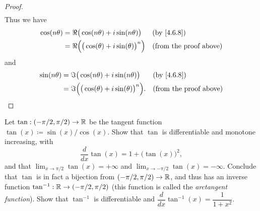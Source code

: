 \begin{proof}
\begin{align*}
  \end{align*}
  Thus we have
  \begin{align*}
    \cos(n \theta) & = \Re\big(\cos(n \theta) + i \sin(n \theta)\big)         &  & \text{(by \cref{4.6.8})}      \\
                   & = \Re\Big(\big(\cos(\theta) + i \sin(\theta)\big)^n\Big) &  & \text{(from the proof above)}
  \end{align*}
  and
  \begin{align*}
    \sin(n \theta) & = \Im\big(\cos(n \theta) + i \sin(n \theta)\big)          &  & \text{(by \cref{4.6.8})}      \\
                   & = \Im\Big(\big(\cos(\theta) + i \sin(\theta)\big)^n\Big). &  & \text{(from the proof above)}
  \end{align*}
\end{proof}

\begin{ex}\label{ex:4.7.8}
  Let \(\tan : (- \pi / 2, \pi / 2) \to \mathbb{R}\) be the tangent function \(\tan(x) \coloneqq \sin(x) / \cos(x)\).
  Show that \(\tan\) is differentiable and monotone increasing, with
  \[
    \dfrac{d}{dx} \tan(x) = 1 + \big(\tan(x)\big)^2,
  \]
  and that \(\lim_{x \to \pi / 2} \tan(x) = +\infty\) and \(\lim_{x \to -\pi / 2} \tan(x) = -\infty\).
  Conclude that \(\tan\) is in fact a bijection from \((- \pi / 2, \pi / 2) \to \mathbb{R}\), and thus has an inverse function \(\tan^{-1} : \mathbb{R} \to (- \pi / 2, \pi / 2)\)
  (this function is called the \emph{arctangent function}).
  Show that \(\tan^{-1}\) is differentiable and \(\dfrac{d}{dx} \tan^{-1}(x) = \dfrac{1}{1 + x^2}\).
\end{ex}

